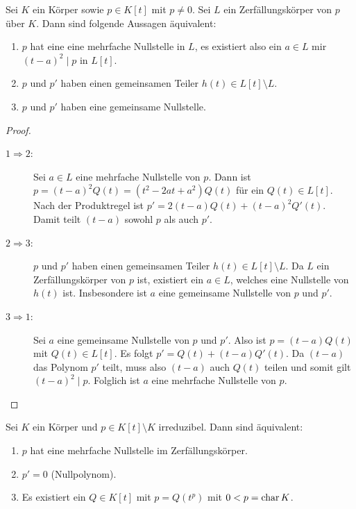 \documentclass[12pt,a4paper]{scrartcl}
\begin{document}
\begin{satz} \label{thm:18.3}
	Sei $K$ ein Körper sowie $p\in K[t]$ mit $p\neq 0$. Sei $L$ ein Zerfällungskörper von $p$ über $K$. Dann sind folgende Aussagen äquivalent:
	\begin{enumerate}
		\item $p$ hat eine eine mehrfache Nullstelle in $L$, es existiert also ein $a\in L$ mir $(t-a)^2\mid p$ in $L[t]$.
		\item $p$ und $p'$ haben einen gemeinsamen Teiler $h(t)\in L[t]\setminus L$.
		\item $p$ und $p'$ haben eine gemeinsame Nullstelle.
	\end{enumerate}
\end{satz}
\begin{proof}
	\leavevmode
	\begin{description}
		\item[\glqq$1\Rightarrow 2$\grqq:] Sei $a\in L$ eine mehrfache Nullstelle von $p$. Dann ist $p = (t-a)^2Q(t) = (t^2-2at+a^2)Q(t)$ für ein $Q(t)\in L[t]$. Nach der Produktregel ist $p' = 2(t-a)Q(t) + (t-a)^2Q'(t)$. Damit teilt $(t-a)$ sowohl $p$ als auch $p'$.
		\item[\glqq$2\Rightarrow 3$\grqq:] $p$ und $p'$ haben einen gemeinsamen Teiler $h(t)\in L[t]\setminus L$. Da $L$ ein Zerfällungskörper von $p$ ist, existiert ein $a\in L$, welches eine Nullstelle von $h(t)$ ist. Insbesondere ist $a$ eine gemeinsame Nullstelle von $p$ und $p'$.
		\item[\glqq$3\Rightarrow 1$\grqq:] Sei $a$ eine gemeinsame Nullstelle von $p$ und $p'$. Also ist $p = (t-a)Q(t)$ mit $Q(t)\in L[t]$. Es folgt $p' = Q(t) + (t-a)Q'(t)$. Da $(t-a)$ das Polynom $p'$ teilt, muss also $(t-a)$ auch $Q(t)$ teilen und somit gilt $(t-a)^2\mid p$. Folglich ist $a$ eine mehrfache Nullstelle von $p$.
	\end{description}
\end{proof}
\begin{kor}
	Sei $K$ ein Körper und $p\in K[t]\setminus K$ irreduzibel. Dann sind äquivalent:
	\begin{enumerate}
		\item $p$ hat eine mehrfache Nullstelle im Zerfällungskörper.
		\item $p' = 0$ \textup(Nullpolynom\textup).
		\item Es existiert ein $Q\in K[t]$ mit $p = Q(t^p)$ mit $0<p = \operatorname{char} K$.
	\end{enumerate}
\end{kor}
\end{document}

